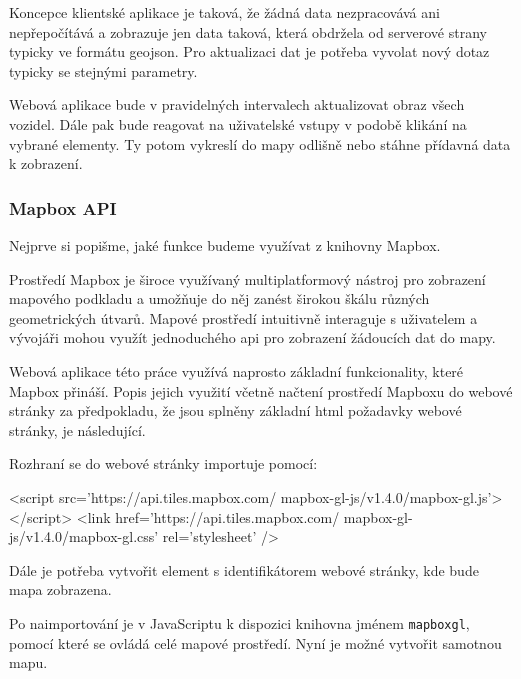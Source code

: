 \bigbreak


Koncepce klientské aplikace je taková, že žádná data nezpracovává ani nepřepočítává a zobrazuje jen data taková, která obdržela od serverové strany typicky ve formátu \gls{geojson}. Pro aktualizaci dat je potřeba vyvolat nový dotaz typicky se stejnými parametry.


\bigbreak


Webová aplikace bude v pravidelných intervalech aktualizovat obraz všech vozidel. Dále pak bude reagovat na uživatelské vstupy v podobě klikání na vybrané elementy. Ty potom vykreslí do mapy odlišně nebo stáhne přídavná data k zobrazení.


\subsubsection{Mapbox API}


Nejprve si popišme, jaké funkce budeme využívat z knihovny Mapbox.


\bigbreak


Prostředí Mapbox je široce využívaný multiplatformový nástroj pro zobrazení mapového podkladu a umožňuje do něj zanést širokou škálu různých geometrických útvarů. Mapové prostředí intuitivně interaguje s uživatelem a vývojáři mohou využít jednoduchého \gls{api} pro zobrazení žádoucích dat do mapy.


\bigbreak


Webová aplikace této práce využívá naprosto základní funkcionality, které Mapbox přináší. Popis jejich využití včetně načtení prostředí Mapboxu do webové stránky za předpokladu, že jsou splněny základní \gls{html} požadavky webové stránky, je následující.


\bigbreak


Rozhraní se do webové stránky importuje pomocí:


\begin{code}[frame=none]
<script src='https://api.tiles.mapbox.com/
  mapbox-gl-js/v1.4.0/mapbox-gl.js'></script>
<link href='https://api.tiles.mapbox.com/
  mapbox-gl-js/v1.4.0/mapbox-gl.css' rel='stylesheet' />
\end{code}


\bigbreak


Dále je potřeba vytvořit element s identifikátorem webové stránky, kde bude mapa zobrazena.


\bigbreak


Po naimportování je v JavaScriptu k dispozici knihovna jménem \verb-mapboxgl-, pomocí které se ovládá celé mapové prostředí. Nyní je možné vytvořit samotnou mapu.


